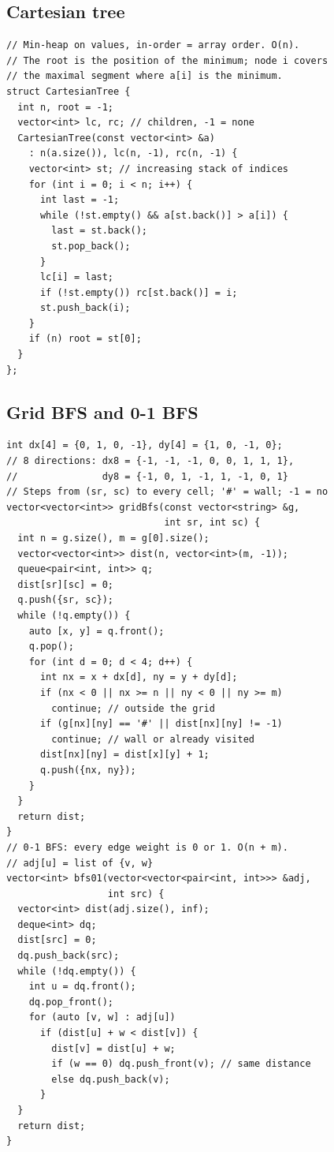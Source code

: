 \documentclass[8pt, a4paper]{article}
\begin{document}
\begin{multicols*}{3}
\subsection{Cartesian tree}
\begin{lstlisting}
// Min-heap on values, in-order = array order. O(n).
// The root is the position of the minimum; node i covers
// the maximal segment where a[i] is the minimum.
struct CartesianTree {
  int n, root = -1;
  vector<int> lc, rc; // children, -1 = none
  CartesianTree(const vector<int> &a)
    : n(a.size()), lc(n, -1), rc(n, -1) {
    vector<int> st; // increasing stack of indices
    for (int i = 0; i < n; i++) {
      int last = -1;
      while (!st.empty() && a[st.back()] > a[i]) {
        last = st.back();
        st.pop_back();
      }
      lc[i] = last;
      if (!st.empty()) rc[st.back()] = i;
      st.push_back(i);
    }
    if (n) root = st[0];
  }
};
\end{lstlisting}
\subsection{Grid BFS and 0-1 BFS}
\begin{lstlisting}
int dx[4] = {0, 1, 0, -1}, dy[4] = {1, 0, -1, 0};
// 8 directions: dx8 = {-1, -1, -1, 0, 0, 1, 1, 1},
//               dy8 = {-1, 0, 1, -1, 1, -1, 0, 1}
// Steps from (sr, sc) to every cell; '#' = wall; -1 = no
vector<vector<int>> gridBfs(const vector<string> &g,
                            int sr, int sc) {
  int n = g.size(), m = g[0].size();
  vector<vector<int>> dist(n, vector<int>(m, -1));
  queue<pair<int, int>> q;
  dist[sr][sc] = 0;
  q.push({sr, sc});
  while (!q.empty()) {
    auto [x, y] = q.front();
    q.pop();
    for (int d = 0; d < 4; d++) {
      int nx = x + dx[d], ny = y + dy[d];
      if (nx < 0 || nx >= n || ny < 0 || ny >= m)
        continue; // outside the grid
      if (g[nx][ny] == '#' || dist[nx][ny] != -1)
        continue; // wall or already visited
      dist[nx][ny] = dist[x][y] + 1;
      q.push({nx, ny});
    }
  }
  return dist;
}
// 0-1 BFS: every edge weight is 0 or 1. O(n + m).
// adj[u] = list of {v, w}
vector<int> bfs01(vector<vector<pair<int, int>>> &adj,
                  int src) {
  vector<int> dist(adj.size(), inf);
  deque<int> dq;
  dist[src] = 0;
  dq.push_back(src);
  while (!dq.empty()) {
    int u = dq.front();
    dq.pop_front();
    for (auto [v, w] : adj[u])
      if (dist[u] + w < dist[v]) {
        dist[v] = dist[u] + w;
        if (w == 0) dq.push_front(v); // same distance
        else dq.push_back(v);
      }
  }
  return dist;
}
\end{lstlisting}

\end{multicols*}
\end{document}
